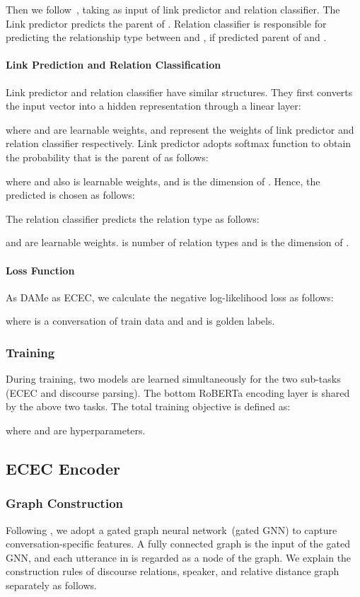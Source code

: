 \documentclass[11pt]{article}
\begin{document}
Then we follow~\citet{shi_deep_2019}, taking  as input of link predictor and relation classifier.
The Link predictor predicts the parent of .
Relation classifier is responsible for predicting the relationship type  between  and , if predicted parent of  and .

\paragraph{Link Prediction and Relation Classification}
Link predictor and relation classifier have similar structures.
They first converts the input vector  into a hidden representation through a linear layer:

where  and  are learnable weights,
and  represent the weights of link predictor and relation classifier respectively.
Link predictor adopts softmax function to obtain the probability that  is the parent  of  as follows:

where  and  also is learnable weights, and  is the dimension of .
Hence, the predicted  is chosen as follows:

The relation classifier predicts the relation type  as follows:

 and  are learnable weights. 
 is number of relation types and  is the dimension of .

\paragraph{Loss Function}
As DAMe as ECEC, we calculate the negative log-likelihood loss as follows:



where  is a conversation of train data and  and  is golden labels.

\subsubsection{Training}
During training, two models are learned simultaneously for the two sub-tasks (ECEC and discourse parsing).
The bottom RoBERTa encoding layer is shared by the above two tasks.
The total training objective is defined as:

where  and  are hyperparameters.

\subsection{ECEC Encoder}\label{subsec:ECEC}

\subsubsection{Graph Construction}
Following \citet{wang2021structure,gatedgnn2016}, we adopt a gated graph neural network~(gated GNN) to capture conversation-specific features.
A fully connected graph is the input of the gated GNN, and each utterance in  is regarded as a node of the graph.
We explain the construction rules of discourse relations, speaker, and relative distance graph separately as follows.
\end{document}
